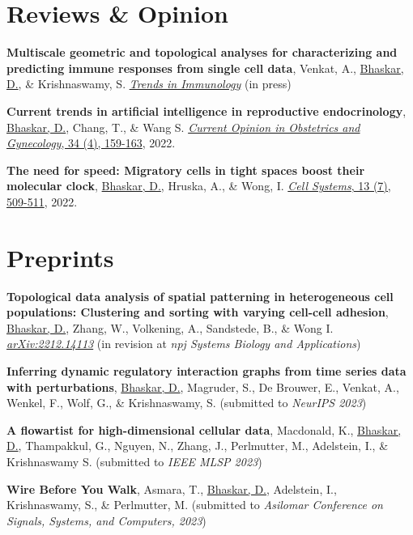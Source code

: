 \documentclass[margin,line]{res}
\begin{document}
\begin{resume}
\section{\sc Reviews \& Opinion}
{
\renewcommand\leftmargini{0em}
\renewcommand{\labelenumi}{R\theenumi}
\begin{etaremune}[start=3]
\item{\bf Multiscale geometric and topological analyses for characterizing and predicting immune responses from single cell data},
Venkat, A., \underline{Bhaskar, D.}, \& Krishnaswamy, S.
\href{https://www.cell.com/trends/immunology/home}{\textit{Trends in Immunology}} (in press)
\item{\bf Current trends in artificial intelligence in reproductive endocrinology},
\underline{Bhaskar, D.}, Chang, T., \& Wang S.
\href{https://doi.org/10.1097/GCO.0000000000000796}{\textit{Current Opinion in Obstetrics and Gynecology}, 34 (4), 159-163}, 2022.
\item{\bf The need for speed: Migratory cells in tight spaces boost their molecular clock},
\underline{Bhaskar, D.}, Hruska, A., \& Wong, I.
\href{https://doi.org/10.1016/j.cels.2022.06.002}{\textit{Cell Systems}, 13 (7), 509-511}, 2022.
\end{etaremune}
}

\vspace*{.15cm}

\section{\sc Preprints}
{
\renewcommand\leftmargini{0em}
\renewcommand{\labelenumi}{P\theenumi}
\begin{etaremune}[start=6]
\item{\bf Topological data analysis of spatial patterning in heterogeneous cell populations: Clustering and sorting with varying cell-cell adhesion},
\underline{Bhaskar, D.}, Zhang, W., Volkening, A., Sandstede, B., \& Wong I.
\href{https://arxiv.org/abs/2212.14113}{\textit{arXiv:2212.14113}} (in revision at \textit{npj Systems Biology and Applications})
\item{\bf Inferring dynamic regulatory interaction graphs from time series data with perturbations},
\underline{Bhaskar, D.}, Magruder, S., De Brouwer, E., Venkat, A., Wenkel, F., Wolf, G., \& Krishnaswamy, S.
(submitted to \textit{NeurIPS 2023})
\item{\bf A flowartist for high-dimensional cellular data},
Macdonald, K., \underline{Bhaskar, D.}, Thampakkul, G., Nguyen, N., Zhang, J., Perlmutter, M., Adelstein, I., \& Krishnaswamy S.
(submitted to \textit{IEEE MLSP 2023})
\item{\bf Wire Before You Walk},
Asmara, T., \underline{Bhaskar, D.}, Adelstein, I., Krishnaswamy, S., \& Perlmutter, M.
(submitted to \textit{Asilomar Conference on Signals, Systems, and Computers, 2023})
\end{etaremune}
}


\end{resume}
\end{document}
